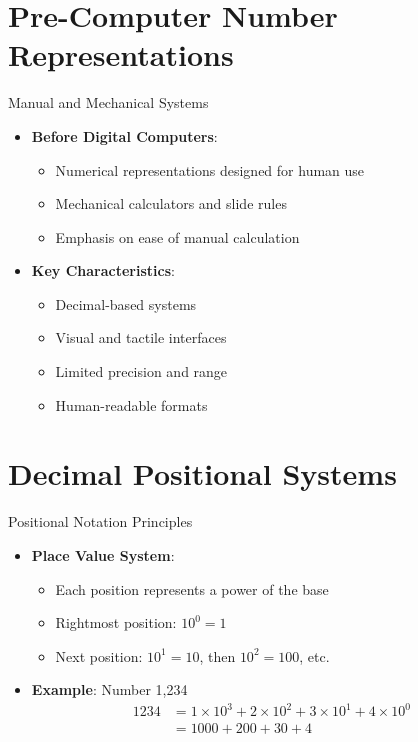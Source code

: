 \documentclass[aspectratio=169,11pt]{beamer}
\newcommand{\concept}[1]{\textbf{\color{accentcolor}#1}}
\begin{document}
\section{Pre-Computer Number Representations}

\begin{frame}{Manual and Mechanical Systems}
\begin{itemize}
\item \concept{Before Digital Computers}:
\begin{itemize}
\item Numerical representations designed for human use
\item Mechanical calculators and slide rules
\item Emphasis on ease of manual calculation
\end{itemize}
\vspace{0.5cm}
\item \concept{Key Characteristics}:
\begin{itemize}
\item Decimal-based systems
\item Visual and tactile interfaces
\item Limited precision and range
\item Human-readable formats
\end{itemize}
\end{itemize}
\end{frame}

\section{Decimal Positional Systems}

\begin{frame}{Positional Notation Principles}
\begin{itemize}
\item \concept{Place Value System}:
\begin{itemize}
\item Each position represents a power of the base
\item Rightmost position: $10^0 = 1$
\item Next position: $10^1 = 10$, then $10^2 = 100$, etc.
\end{itemize}
\vspace{0.5cm}
\item \concept{Example}: Number 1,234
\begin{align}
1234 &= 1 \times 10^3 + 2 \times 10^2 + 3 \times 10^1 + 4 \times 10^0\\
&= 1000 + 200 + 30 + 4
\end{align}
\end{itemize}
\end{frame}
\end{document}
